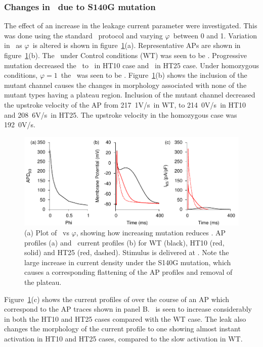\subsubsection{Changes in \apd\ due to S140G mutation}

The effect of an increase in the leakage current parameter were investigated.
This was done using the standard \apd\ protocol and varying $\varphi$\ between
0 and 1.
Variation in \apd\ as $\varphi$\ is altered is shown in
figure~\ref{atrium:iks:apd}(a).
Representative APs are shown in figure~\ref{atrium:iks:apd}(b).
The \apd\ under Control conditions (WT) was seen to be .
Progressive mutation decreased the \apd\ to \ in HT10 case and
\ in HT25 case.
Under homozygous conditions, $\varphi = 1$\, the \apd\ was seen to be .
Figure~\ref{atrium:iks:apd}(b) shows the inclusion of the mutant channel causes
the changes in morphology associated with none of the mutant types having a
plateau region.
Inclusion of the mutant channel decreased the upstroke velocity of the AP from
\unit{217.1}{V/s}\ in WT, to \unit{214.0}{V/s}\ in HT10 and \unit{208.6}{V/s}\
in HT25.
The upstroke velocity in the homozygous case was \unit{192.0}{V/s}.
\begin{figure}
\includegraphics{figures/atrium/iks/figures/02_APD}
\caption[AP and current profiles with S140G mutation]{
\label{atrium:iks:apd}
(a) Plot of \apd\ vs $\varphi$, showing how increasing mutation reduces \apd.
AP profiles (a) and \ii{Ks}\ current profiles (b) for WT (black), HT10 (red,
solid) and HT25 (red, dashed).
Stimulus is delivered at .
Note the large increase in current density under the S140G mutation, which
causes a corresponding flattening of the AP profiles and removal of the plateau.
}
\end{figure}
Figure~\ref{atrium:iks:apd}(c) shows the current profiles of  over the course of
an AP which correspond to the AP traces shown in panel B.
\ii{Ks}\ is seen to increase considerably in both the HT10 and HT25 cases
compared with the WT case.
The leak also changes the morphology of the current profile to one showing
almost instant activation in HT10 and HT25 cases, compared to the slow
activation in WT.

